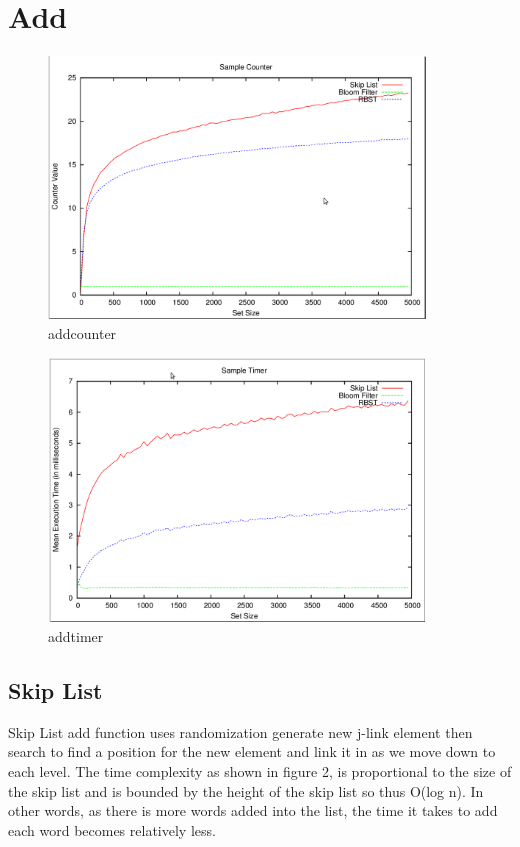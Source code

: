 \documentclass[11pt]{article}
\begin{document}
\section*{Add}
\begin{figure}[ht]
\centering
\includegraphics[height=70mm,width=100mm]{addcounter.png}
\caption{addcounter}
\end{figure}
\begin{figure}[ht]
\centering
\includegraphics[height=70mm,width=100mm]{addtimer.png}
\caption{addtimer}
\end{figure}
\subsection*{Skip List}
Skip List add function uses randomization
generate new j-link element then search to find a position for the new element
and link it in as we move down to each level. The time complexity as shown in figure 2, is proportional to the size of the skip list and is bounded by the height of the skip list so thus O(log n). In other words, as there is more words added into the list, the time it takes to add each word becomes relatively less.
\end{document}
